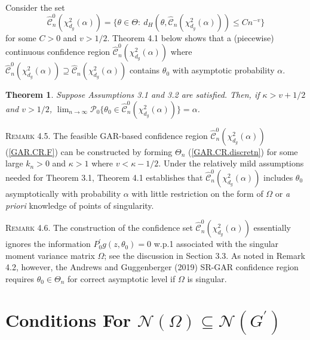 \documentclass[hidelinks, 11 pt, a4paper, pdflatex]{article}
\newtheorem{theorem}{Theorem}[section]
\begin{document}
{  Consider the set
   \begin{equation} \label{GAR.CR.F}
    \hat{\mathcal{C}}_{n}^{0}(\chi_{d_{g}}^{2}(\alpha)) = \{\theta \in \Theta:~d_{H}(\theta,\hat{\mathcal{C}}_{n}(\chi_{d_{g}}^{2}(\alpha))) \leq Cn^{-v}\}
   \end{equation}
  for some $C > 0$ and $v > 1/2$. Theorem 4.1 below shows that a (piecewise) continuous confidence region $\hat{\mathcal{C}}_{n}^{0}(\chi_{d_{g}}^{2}(\alpha))$ where $\hat{\mathcal{C}}_{n}^{0}(\chi_{d_{g}}^{2}(\alpha)) \supseteq \hat{\mathcal{C}}_{n}(\chi_{d_{g}}^{2}(\alpha))$ contains $\theta_{0}$ with asymptotic probability $\alpha$.
   \begin{theorem}
    Suppose Assumptions 3.1 and 3.2 are satisfied. Then, if $\kappa > v + 1/2$ and $v > 1/2$, $\lim_{n \rightarrow \infty}\mathcal{P}_0\{\theta_0 \in \hat{\mathcal{C}}_{n}^{0}(\chi_{d_{g}}^{2}(\alpha))\} = \alpha$.
   \end{theorem}

   \textsc{Remark 4.5}. The feasible GAR-based confidence region $\hat{\mathcal{C}}_{n}^{0}(\chi_{d_{g}}^{2}(\alpha))$ (\ref{GAR.CR.F}) can be constructed by forming $\Theta_{n}$
    (\ref{GAR.CR.discretn}) for some large $k_{n} > 0$ and $\kappa > 1$ where $v < \kappa - 1/2$. Under the relatively mild assumptions needed for Theorem 3.1, Theorem 4.1 establishes that $\hat{\mathcal{C}}_{n}^{0}(\chi_{d_{g}}^{2}(\alpha))$ includes $\theta_{0}$ asymptotically with probability $\alpha$ with little restriction on the form of $\Omega$ or \textit{a priori} knowledge of points of singularity.

   \textsc{Remark 4.6}. The construction of the confidence set $\hat{\mathcal{C}}_{n}^{0}(\chi_{d_{g}}^{2}(\alpha))$ essentially ignores the information $P_{0}^{\prime}g(z,\theta_{0}) =
    0$ w.p.1 associated with the singular moment variance matrix $\Omega$; see the discussion in Section 3.3. As noted in Remark 4.2, however, the Andrews and Guggenberger (2019) SR-GAR confidence region requires $\theta _{0} \in \Theta_{n}$ for correct asymptotic level if $\Omega$ is singular.



 \section{Conditions For $\mathcal{N}(\Omega) \subseteq \mathcal{N}(G^{\prime })$}

}
\end{document}
